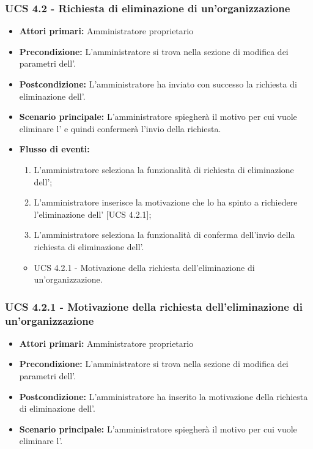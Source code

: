 \subsubsection{UCS 4.2 - Richiesta di eliminazione di un'organizzazione}%
\begin{itemize}
	\item \textbf{Attori primari:} Amministratore proprietario
	\item \textbf{Precondizione:} L'amministratore si trova nella sezione di modifica dei parametri dell'.
	\item \textbf{Postcondizione:} L'amministratore ha inviato con successo la richiesta di eliminazione dell'.
	\item \textbf{Scenario principale:} L'amministratore spiegherà il motivo per cui vuole eliminare l' e quindi confermerà l'invio della richiesta.
	\item \textbf{Flusso di eventi:}
	\begin{enumerate}
		\item L'amministratore seleziona la funzionalità di richiesta di eliminazione dell';
		\item L'amministratore inserisce la motivazione che lo ha spinto a richiedere l'eliminazione dell' [UCS 4.2.1];
		\item L'amministratore seleziona la funzionalità di conferma dell'invio della richiesta di eliminazione dell'.
	\end{enumerate}
	\begin{itemize}
		\item UCS 4.2.1 - Motivazione della richiesta dell'eliminazione di un'organizzazione.
	\end{itemize}
\end{itemize}

\subsubsection{UCS 4.2.1 - Motivazione della richiesta dell'eliminazione di un'organizzazione}%
\begin{itemize}
	\item \textbf{Attori primari:} Amministratore proprietario
	\item \textbf{Precondizione:} L'amministratore si trova nella sezione di modifica dei parametri dell'.
	\item \textbf{Postcondizione:} L'amministratore ha inserito la motivazione della richiesta di eliminazione dell'.
	\item \textbf{Scenario principale:} L'amministratore spiegherà il motivo per cui vuole eliminare l'.
\end{itemize}

